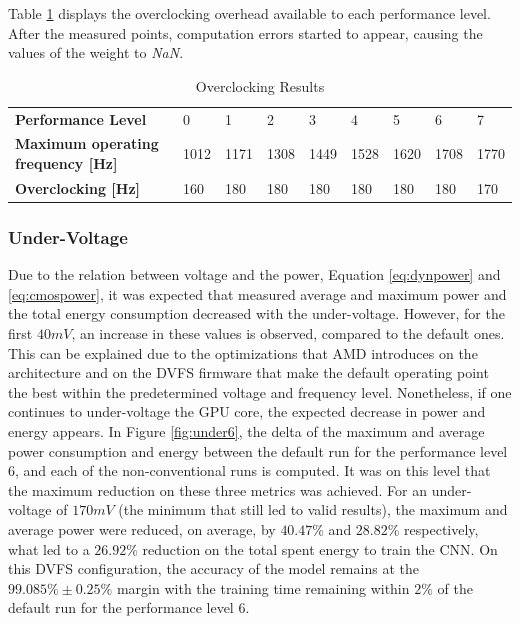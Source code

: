 Table \ref{tab:overclocking-res} displays the overclocking overhead available to each performance level. After the measured points, computation errors started to appear, causing the values of the weight to \textit{NaN}.

\begin{table}[!htb]
\centering
\begin{tabular}{l|llllllll}
\textbf{Performance Level}  & 0   & 1   & 2   & 3   & 4   & 5   & 6   & 7    \\
\textbf{Maximum operating frequency [Hz]}    & 1012  & 1171 & 1308 & 1449 & 1528 & 1620 & 1708 & 1770 \\
\textbf{Overclocking  {[}Hz{]}} &  160  & 180 & 180 & 180 & 180 & 180 & 180 &  170
\end{tabular}
\caption{Overclocking  Results}
\label{tab:overclocking-res}
\end{table}

\subsubsection{Under-Voltage}
\label{section:under-voltage}

Due to the relation between voltage and the power, Equation \ref{eq:dynpower} and \ref{eq:cmospower}, it was expected that measured average and maximum power and the total energy consumption decreased with the under-voltage. However, for the first $40mV$, an increase in these values is observed, compared to the default ones. This can be explained due to the optimizations that AMD introduces on the architecture and on the DVFS firmware that make the default operating point the best within the predetermined voltage and frequency level. Nonetheless, if one continues to under-voltage the GPU core, the expected decrease in power and energy appears. In Figure \ref{fig:under6}, the delta of the maximum and average power consumption and energy between the default run for the performance level 6, and each of the non-conventional runs is computed. It was on this level that the maximum reduction on these three metrics was achieved. For an under-voltage of $170mV$ (the minimum that still led to valid results), the maximum and average power were reduced, on average,  by $40.47\%$ and  $28.82\%$  respectively, what led to a $26.92\%$ reduction on the total spent energy to train the CNN. On this DVFS configuration, the accuracy of the model remains at the $99.085\% \pm 0.25\%$ margin with the training time remaining within $2\%$ of the default run for the performance level 6.

